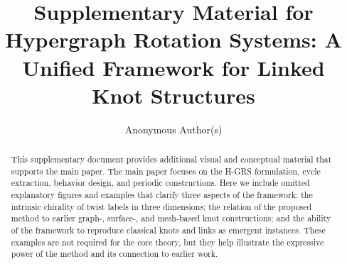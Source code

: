 \documentclass[acmtog,nonacm]{acmart}
\begin{document}
\title[Supplementary Material:H-GRS]{Supplementary Material for Hypergraph Rotation Systems: A Unified Framework for Linked Knot
Structures}

\author{Anonymous Author(s)}

\begin{abstract}
This supplementary document provides additional visual and conceptual material that supports the main paper. The main paper focuses on the H-GRS formulation, cycle extraction, behavior design, and periodic constructions. Here we include omitted explanatory figures and examples that clarify three aspects of the framework: the intrinsic chirality of twist labels in three dimensions; the relation of the proposed method to earlier graph-, surface-, and mesh-based knot constructions; and the ability of the framework to reproduce classical knots and links as emergent instances. These examples are not required for the core theory, but they help illustrate the expressive power of the method and its connection to earlier work.
\end{abstract}
\end{document}
